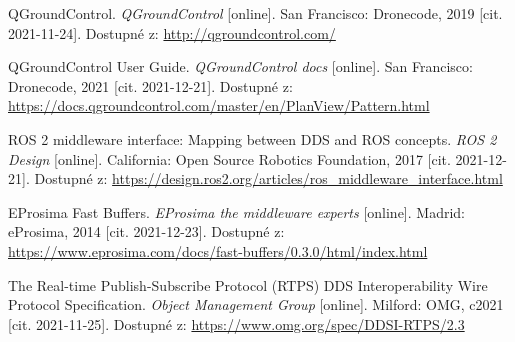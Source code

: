 \begin{thebibliography}{99}

QGroundControl. \textit{QGroundControl} [online]. San Francisco: Dronecode, 2019 [cit. 2021-11-24]. Dostupné z: \href{http://qgroundcontrol.com/}{http://qgroundcontrol.com/}

QGroundControl User Guide. \textit{QGroundControl docs} [online]. San Francisco: Dronecode, 2021 [cit. 2021-12-21]. Dostupné z: \href{https://docs.qgroundcontrol.com/master/en/PlanView/Pattern.html}{https://docs.qgroundcontrol.com/master/en/PlanView/Pattern.html}

ROS 2 middleware interface: Mapping between DDS and ROS concepts. \textit{ROS 2 Design} [online]. California: Open Source Robotics Foundation, 2017 [cit. 2021-12-21]. Dostupné z: \href{https://design.ros2.org/articles/ros\_middleware\_interface.html}{https://design.ros2.org/articles/ros\_middleware\_interface.html}




EProsima Fast Buffers. \textit{EProsima the middleware experts} [online]. Madrid: eProsima, 2014 [cit. 2021-12-23]. Dostupné z: \href{https://www.eprosima.com/docs/fast-buffers/0.3.0/html/index.html}{https://www.eprosima.com/docs/fast-buffers/0.3.0/html/index.html}

The Real-time Publish-Subscribe Protocol (RTPS) DDS Interoperability Wire Protocol Specification. \textit{Object Management Group} [online]. Milford: OMG, c2021 [cit. 2021-11-25]. Dostupné z: \href{https://www.omg.org/spec/DDSI-RTPS/2.3}{https://www.omg.org/spec/DDSI-RTPS/2.3}
	

\end{thebibliography}
